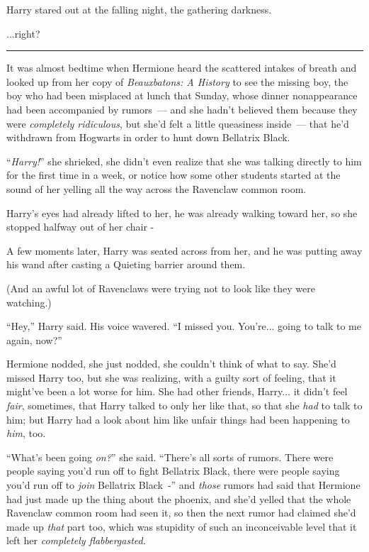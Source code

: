 Harry stared out at the falling night, the gathering darkness.

...right?

\begin{center}\rule{3in}{0.4pt}\end{center}

It was almost bedtime when Hermione heard the scattered intakes of breath and looked up from her copy of \emph{Beauxbatons: A History} to see the missing boy, the boy who had been misplaced at lunch that Sunday, whose dinner nonappearance had been accompanied by rumors~--- and she hadn't believed them because they were \emph{completely ridiculous}, but she'd felt a little queasiness inside~--- that he'd withdrawn from Hogwarts in order to hunt down Bellatrix Black.

``\emph{Harry!}'' she shrieked, she didn't even realize that she was talking directly to him for the first time in a week, or notice how some other students started at the sound of her yelling all the way across the Ravenclaw common room.

Harry's eyes had already lifted to her, he was already walking toward her, so she stopped halfway out of her chair -

A few moments later, Harry was seated across from her, and he was putting away his wand after casting a Quieting barrier around them.

(And an awful lot of Ravenclaws were trying not to look like they were watching.)

``Hey,'' Harry said. His voice wavered. ``I missed you. You're... going to talk to me again, now?''

Hermione nodded, she just nodded, she couldn't think of what to say. She'd missed Harry too, but she was realizing, with a guilty sort of feeling, that it might've been a lot worse for him. She had other friends, Harry... it didn't feel \emph{fair}, sometimes, that Harry talked to only her like that, so that she \emph{had} to talk to him; but Harry had a look about him like unfair things had been happening to \emph{him}, too.

``What's been going \emph{on?}'' she said. ``There's all sorts of rumors. There were people saying you'd run off to fight Bellatrix Black, there were people saying you'd run off to \emph{join} Bellatrix Black~-'' and \emph{those} rumors had said that Hermione had just made up the thing about the phoenix, and she'd yelled that the whole Ravenclaw common room had seen it, so then the next rumor had claimed she'd made up \emph{that} part too, which was stupidity of such an inconceivable level that it left her \emph{completely flabbergasted.}

